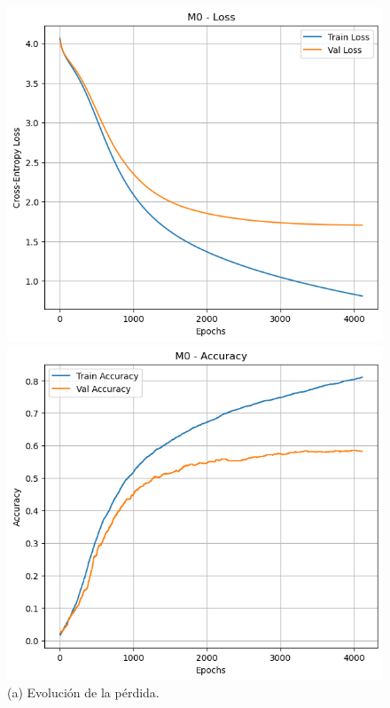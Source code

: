 \documentclass[11pt]{article}
\begin{document}
\begin{figure}[H]
    \centering
    \begin{minipage}[t]{0.32\textwidth}
        \centering
        \includegraphics[width=\linewidth]{figures/loss_m0.png}
        \caption*{(a) Evolución de la pérdida.}
    \end{minipage}
    \hfill
    \begin{minipage}[t]{0.32\textwidth}
        \centering
        \includegraphics[width=\linewidth]{figures/acc_m0.png}

\end{minipage}
\end{figure}
\end{document}
